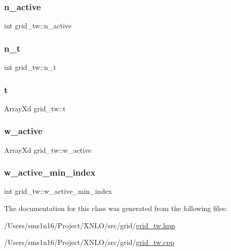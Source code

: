 \subsubsection{\texorpdfstring{n\_active}{n\_active}}
{\footnotesize\ttfamily int grid\+\_\+tw\+::n\+\_\+active}

\mbox{\label{classgrid__tw_ac121ce740479f628bdaa54627540ad42}} 
\subsubsection{\texorpdfstring{n\_t}{n\_t}}
{\footnotesize\ttfamily int grid\+\_\+tw\+::n\+\_\+t}

\mbox{\label{classgrid__tw_a918f1e6d18056d0f6da08fe01089b9b0}} 
\subsubsection{\texorpdfstring{t}{t}}
{\footnotesize\ttfamily Array\+Xd grid\+\_\+tw\+::t}

\mbox{\label{classgrid__tw_a66922766c9dfe5c4667e55e678b134b9}} 
\subsubsection{\texorpdfstring{w\_active}{w\_active}}
{\footnotesize\ttfamily Array\+Xd grid\+\_\+tw\+::w\+\_\+active}

\mbox{\label{classgrid__tw_a27d987fb3c8cbacf9cd152b83477f0d9}} 
\subsubsection{\texorpdfstring{w\_active\_min\_index}{w\_active\_min\_index}}
{\footnotesize\ttfamily int grid\+\_\+tw\+::w\+\_\+active\+\_\+min\+\_\+index}



The documentation for this class was generated from the following files\+:\begin{DoxyCompactItemize}
\item 
/\+Users/sms1n16/\+Project/\+X\+N\+L\+O/src/grid/\mbox{\hyperlink{grid__tw_8hpp}{grid\+\_\+tw.\+hpp}}\item 
/\+Users/sms1n16/\+Project/\+X\+N\+L\+O/src/grid/\mbox{\hyperlink{grid__tw_8cpp}{grid\+\_\+tw.\+cpp}}\end{DoxyCompactItemize}
